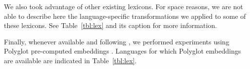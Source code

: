 \documentclass[11pt,a4paper]{article}
\begin{document}
We also took advantage of other existing lexicons. For space reasons, we are not able to describe here the language-specific
transformations we applied to some of these lexicons. See Table~\ref{tbl:lex} and its caption for more information.


Finally, whenever available and following \citet{plank16}, we performed experiments using Polyglot pre-computed
embeddings \cite{alrfou13}. Languages for which Polyglot embeddings are available are indicated in Table~\ref{tbl:lex}.

\addtocounter{footnote}{-1}

\end{document}
